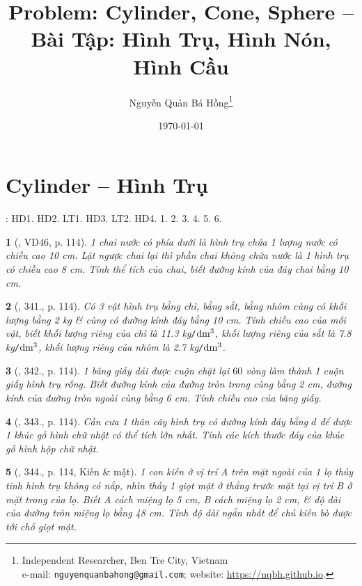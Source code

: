 \documentclass{article}
\title{Problem: Cylinder, Cone, Sphere -- Bài Tập: Hình Trụ, Hình Nón, Hình Cầu}
\author{Nguyễn Quản Bá Hồng\footnote{Independent Researcher, Ben Tre City, Vietnam\\e-mail: \texttt{nguyenquanbahong@gmail.com}; website: \url{https://nqbh.github.io}.}}
\date{\today}
\newtheorem{baitoan}{}
\begin{document}
\maketitle
\tableofcontents


\section{Cylinder -- Hình Trụ}
\cite[Chap. X, \S1, pp. 92--97]{SGK_Toan_9_Canh_Dieu_tap_1}: HD1. HD2. LT1. HD3. LT2. HD4. 1. 2. 3. 4. 5. 6.

\begin{baitoan}[\cite{Binh_Toan_9_tap_2}, VD46, p. 114]
	1 chai nước có phía dưới là hình trụ chứa 1 lượng nước có chiều cao {\rm10 cm}. Lật ngược chai lại thì phần chai không chứa nước là 1 hình trụ có chiều cao {\rm8 cm}. Tính thể tích của chai, biết đường kính của đáy chai bằng {\rm10 cm}.
\end{baitoan}

\begin{baitoan}[\cite{Binh_Toan_9_tap_2}, 341., p. 114]
	Có 3 vật hình trụ bằng chì, bằng sắt, bằng nhôm cùng có khối lượng bằng {\rm2 kg} \& cùng có đường kính đáy bằng {\rm10 cm}. Tính chiều cao của mỗi vật, biết khối lượng riêng của chì là {\rm11.3 kg{\tt/}$\rm dm^3$}, khối lượng riêng của sắt là {\rm7.8 kg{\tt/}$\rm dm^3$}, khối lượng riêng của nhôm là {\rm2.7 kg{\tt/}$\rm dm^3$}.
\end{baitoan}

\begin{baitoan}[\cite{Binh_Toan_9_tap_2}, 342., p. 114]
	1 băng giấy dải được cuộn chặt lại $60$ vòng làm thành 1 cuộn giấy hình trụ rỗng. Biết đường kính của đường tròn trong cùng bằng {\rm2 cm}, đường kính của đường tròn ngoài cùng bằng {\rm6 cm}. Tính chiều cao của băng giấy.
\end{baitoan}

\begin{baitoan}[\cite{Binh_Toan_9_tap_2}, 343., p. 114]
	Cần cưa 1 thân cây hình trụ có đường kính đáy bằng $d$ để được 1 khúc gỗ hình chữ nhật có thể tích lớn nhất. Tính các kích thước đáy của khúc gỗ hình hộp chữ nhật.
\end{baitoan}

\begin{baitoan}[\cite{Binh_Toan_9_tap_2}, 344., p. 114, Kiến \& mật]
	1 con kiến ở vị trí A trên mặt ngoài của 1 lọ thủy tinh hình trụ không có nắp, nhìn thấy 1 giọt mật ở thẳng trước mặt tại vị trí B ở mặt trong của lọ. Biết A cách miệng lọ {\rm5 cm}, B cách miệng lọ {\rm2 cm}, \& độ dài của đường tròn miệng lọ bằng {\rm48 cm}. Tính độ dài ngắn nhất để chú kiến bò được tới chỗ giọt mật.
\end{baitoan}
\end{document}
